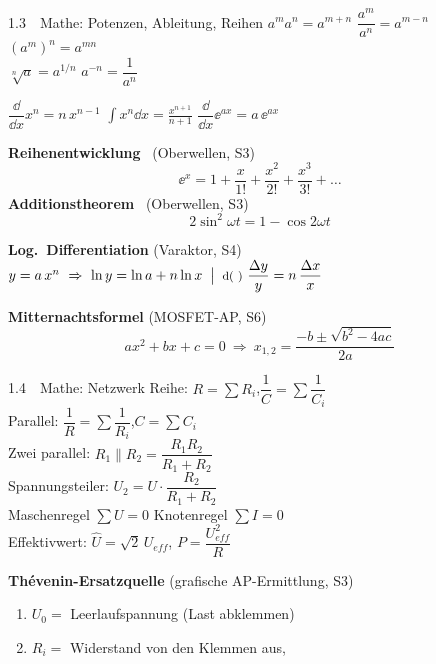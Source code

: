 \begin{FSblock}{1.3\ \ Mathe: Potenzen, Ableitung, Reihen}
$a^m a^n=a^{m+n}$ \quad $\dfrac{a^m}{a^n}=a^{m-n}$ \quad $(a^m)^n=a^{mn}$\\
$\sqrt[n]{a}=a^{1/n}$ \qquad $a^{-n}=\dfrac{1}{a^n}$

\FSline
$\dfrac{\dd}{\dd x}x^n=n\,x^{n-1}$ \quad
$\displaystyle\int x^n\dd x=\frac{x^{n+1}}{n+1}$ \quad
$\dfrac{\dd}{\dd x}\ee^{ax}=a\,\ee^{ax}$

\FSline
\textbf{Reihenentwicklung} \ (Oberwellen, S3)
\[ \ee^{x}=1+\frac{x}{1!}+\frac{x^{2}}{2!}+\frac{x^{3}}{3!}+\dots \]
\textbf{Additionstheorem} \ (Oberwellen, S3)
\[ 2\sin^{2}\omega t=1-\cos 2\omega t \]

\FSline
\textbf{Log.\ Differentiation} (Varaktor, S4)\\
$y=a\,x^{n}\ \Rightarrow\ \ln y=\ln a+n\ln x
 \;\bigm|\;\text{\footnotesize\itshape $\mathrm{d}(\ )$}\ \dfrac{\Delta y}{y}=n\,\dfrac{\Delta x}{x}$

\FSline
\textbf{Mitternachtsformel} (MOSFET-AP, S6)
\[ ax^{2}+bx+c=0\ \Rightarrow\ x_{1,2}=\frac{-b\pm\sqrt{b^{2}-4ac}}{2a} \]
\end{FSblock}

\begin{FSblock}{1.4\ \ Mathe: Netzwerk}
Reihe: $R=\sum R_i$,\quad $\dfrac{1}{C}=\sum\dfrac{1}{C_i}$\\
Parallel: $\dfrac{1}{R}=\sum\dfrac{1}{R_i}$,\quad $C=\sum C_i$\\
Zwei parallel: $R_1\!\parallel\!R_2=\dfrac{R_1R_2}{R_1+R_2}$\\
Spannungsteiler: $U_2=U\cdot\dfrac{R_2}{R_1+R_2}$\\
Maschenregel $\sum U=0$ \quad Knotenregel $\sum I=0$\\
Effektivwert: $\hat U=\sqrt{2}\,U_{e\!f\!f}$,\quad
$P=\dfrac{U_{e\!f\!f}^{2}}{R}$

\FSline
\textbf{Thévenin-Ersatzquelle} (grafische AP-Ermittlung, S3)
\begin{enumerate}
\item $U_0=$ Leerlaufspannung (Last abklemmen)
\item $R_i=$ Widerstand von den Klemmen aus,
\end{enumerate}
\end{FSblock}

